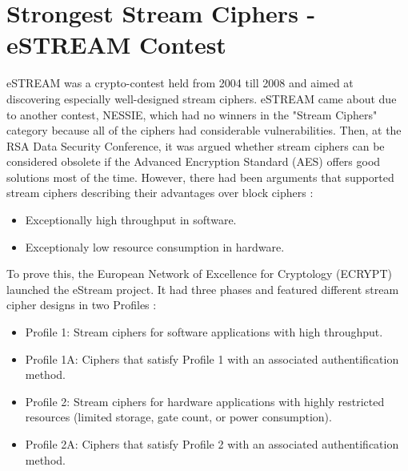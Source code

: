 
\section{Strongest Stream Ciphers - eSTREAM Contest}

eSTREAM was a crypto-contest held from 2004 till 2008 and aimed at discovering especially well-designed stream ciphers. eSTREAM came about due to another contest, NESSIE, which had no winners in the "Stream Ciphers" category because all of the ciphers had considerable vulnerabilities. Then, at the RSA Data Security Conference, it was argued whether stream ciphers can be considered obsolete if the Advanced Encryption Standard (AES) offers good solutions most of the time. However, there had been arguments that supported stream ciphers describing their advantages over block ciphers \cite{robshaw2008estream}:

\begin{itemize}[topsep=0pt]
	\setlength\itemsep{0.1em}
	\item Exceptionally high throughput in software.
	\item Exceptionaly low resource consumption in hardware.
\end{itemize}

\vspace{0.5cm}

To prove this, the European Network of Excellence for Cryptology (ECRYPT) launched the eStream project. It had three phases and featured different stream cipher designs in two Profiles \cite{robshaw2008estream}:

\begin{itemize}
	\item[] Profile 1: Stream ciphers for software applications with high throughput.
	\item[] Profile 1A: Ciphers that satisfy Profile 1 with an associated authentification method.
	\item[] Profile 2: Stream ciphers for hardware applications with highly restricted resources (limited storage, gate count, or power consumption).
	\item[] Profile 2A: Ciphers that satisfy Profile 2 with an associated authentification method.
\end{itemize}

\vspace{0.3cm}


